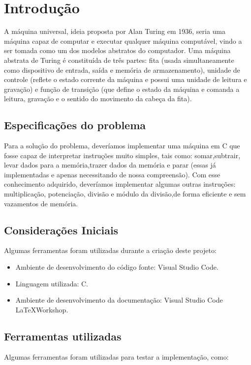 \documentclass{article}
\begin{document}



\section{Introdução}
A máquina universal, ideia proposta por Alan Turing em 1936, seria uma máquina capaz de computar e executar qualquer máquina computável, vindo a ser tomada como um dos modelos abstratos do computador. Uma máquina abstrata de Turing é constituída de três partes: fita (usada simultaneamente como dispositivo de entrada, saída e memória de armazenamento), unidade de controle (reflete o estado corrente da máquina e possui uma unidade de leitura e gravação) e função de transição (que define o estado da máquina e comanda a leitura, gravação e o sentido do movimento da cabeça da fita).


\subsection{Especificações do problema}

Para a solução do problema, deveríamos implementar  uma máquina em C que fosse capaz de interpretar instruções muito simples, tais como: somar,subtrair, levar dados para a memória,trazer dados da memória e parar (essas já implementadas e apenas necessitando de nossa compreensão). Com esse conhecimento adquirido, deveríamos implementar algumas outras instruções: multiplicação, potenciação, divisão e módulo da divisão,de forma eficiente e sem vazamentos de memória.

\subsection{Considerações Iniciais}
Algumas ferramentas foram utilizadas durante a criação deste projeto:

\begin{itemize}
  \item Ambiente de desenvolvimento do código fonte: Visual Studio Code.
  \item Linguagem utilizada: C.
  \item Ambiente de desenvolvimento da documentação: Visual Studio Code \LaTeX Workshop.
\end{itemize}

\subsection{Ferramentas utilizadas}
Algumas ferramentas foram utilizadas para testar a implementação, como:
\end{document}
